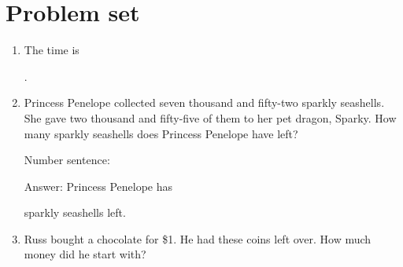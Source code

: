 \documentclass{tufte-book}
\begin{document}
\clearpage\section{Problem set }

\begin{enumerate}

\item {}
The time is \dotfill\bigskip\par\dotfill\bigskip.\par

\item Princess Penelope collected seven thousand and fifty-two sparkly seashells.
She gave two thousand and fifty-five of them to her pet dragon,
Sparky. How many sparkly seashells does Princess Penelope have left?\medskip\par
Number sentence: \dotfill\medskip\par
Answer: Princess Penelope has 
\dotfill\medskip\par\mbox{}\dotfill\medskip\par\mbox{}\dotfill\bigskip
 sparkly seashells left.

\item {}
Russ bought a chocolate for \$1. He had these coins left over. How much money did he start with?\bigskip


\end{enumerate}
\end{document}

